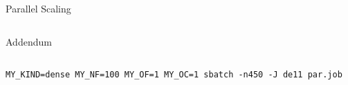 \begin{frame}[b,fragile,label=speedup]{Parallel Scaling}
\begin{columns}[c]
\begin{block}{Addendum}
\begin{itemize}
  \end{itemize}
  \end{block}
  \hyperlink{app:rail1357}{}
  \end{columns}
  \onslide
  \vfill
  \begin{lstlisting}
MY_KIND=dense MY_NF=100 MY_OF=1 MY_OC=1 sbatch -n450 -J de11 par.job
  \end{lstlisting}
\end{frame}
